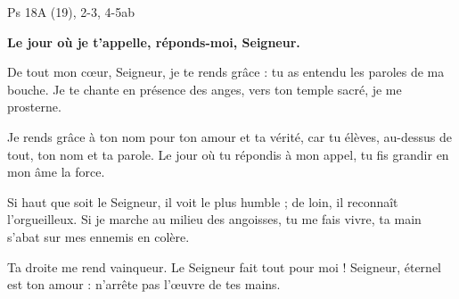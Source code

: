 Ps 18A (19), 2-3, 4-5ab

\textbf{Le jour où je t’appelle, réponds-moi, Seigneur.}

\smallskip

De tout mon cœur, Seigneur, je te rends grâce :
tu as entendu les paroles de ma bouche.
Je te chante en présence des anges,
vers ton temple sacré, je me prosterne.

\smallskip

Je rends grâce à ton nom pour ton amour et ta vérité,
car tu élèves, au-dessus de tout, ton nom et ta parole.
Le jour où tu répondis à mon appel,
tu fis grandir en mon âme la force.

\smallskip

Si haut que soit le Seigneur, il voit le plus humble ;
de loin, il reconnaît l’orgueilleux.
Si je marche au milieu des angoisses, tu me fais vivre,
ta main s’abat sur mes ennemis en colère.

\smallskip

Ta droite me rend vainqueur.
Le Seigneur fait tout pour moi !
Seigneur, éternel est ton amour :
n’arrête pas l’œuvre de tes mains.

